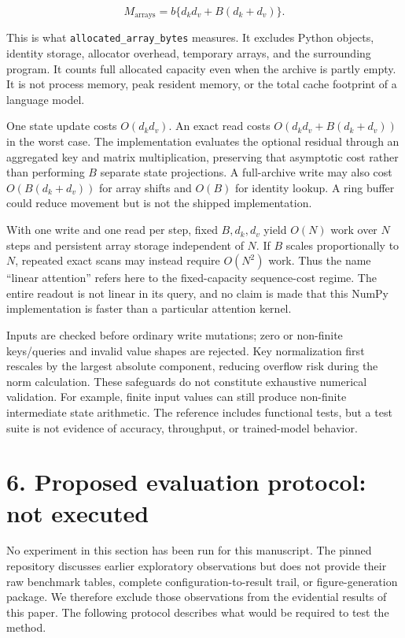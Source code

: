 \documentclass[11pt,a4paper]{article}
\begin{document}
\nopagebreak[4]

\[
M_{\mathrm{arrays}}=b\{d_kd_v+B(d_k+d_v)\}. \tag{14}
\]

This is what \texttt{allocated\_array\_bytes} measures. It excludes Python objects, identity storage, allocator overhead, temporary arrays, and the surrounding program. It counts full allocated capacity even when the archive is partly empty. It is not process memory, peak resident memory, or the total cache footprint of a language model.

One state update costs \(O(d_kd_v)\). An exact read costs \(O(d_kd_v+B(d_k+d_v))\) in the worst case. The implementation evaluates the optional residual through an aggregated key and matrix multiplication, preserving that asymptotic cost rather than performing \(B\) separate state projections. A full-archive write may also cost \(O(B(d_k+d_v))\) for array shifts and \(O(B)\) for identity lookup. A ring buffer could reduce movement but is not the shipped implementation.

With one write and one read per step, fixed \(B,d_k,d_v\) yield \(O(N)\) work over \(N\) steps and persistent array storage independent of \(N\). If \(B\) scales proportionally to \(N\), repeated exact scans may instead require \(O(N^2)\) work. Thus the name ``linear attention'' refers here to the fixed-capacity sequence-cost regime. The entire readout is not linear in its query, and no claim is made that this NumPy implementation is faster than a particular attention kernel.

Inputs are checked before ordinary write mutations; zero or non-finite keys/queries and invalid value shapes are rejected. Key normalization first rescales by the largest absolute component, reducing overflow risk during the norm calculation. These safeguards do not constitute exhaustive numerical validation. For example, finite input values can still produce non-finite intermediate state arithmetic. The reference includes functional tests, but a test suite is not evidence of accuracy, throughput, or trained-model behavior.

\section{6. Proposed evaluation protocol: not executed}\label{proposed-evaluation-protocol-not-executed}

No experiment in this section has been run for this manuscript. The pinned repository discusses earlier exploratory observations but does not provide their raw benchmark tables, complete configuration-to-result trail, or figure-generation package. We therefore exclude those observations from the evidential results of this paper. The following protocol describes what would be required to test the method.
\end{document}

